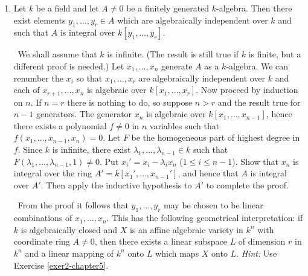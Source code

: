 \begin{enumerate}
    \textit{Hint:} Reduce to the two cases (a) $L$ separable over $K$ and (b) $L$ purely inseparable over $K$. In case (a), embed $L$ in a finite normal separable extension of $K$, and use Exercises \ref{exer13-chapter5} and \ref{exer14-chapter5}. In case (b), if $\mathfrak{q}$ is a prime ideal of $B$ such that $\mathfrak{q} \cap A = \mathfrak{p}$, show that $\mathfrak{q}$ is the set of all $x \in B$ such that $x^{p^m} \in \mathfrak{p}$ for some $m \geq 0$, where $p$ is the characteristic of $K$, and hence that $\Spec(B) \to \Spec(A)$ is bijective in this case.

    \emph{Noether's normalization lemma.}

    \item \label{exer16-chapter5} Let $k$ be a field and let $A \neq 0$ be a finitely generated $k$-algebra. Then there exist elements $y_1, \ldots, y_r \in A$ which are algebraically independent over $k$ and such that $A$ is integral over $k[y_1, \ldots, y_r]$.

    \quad\, We shall assume that $k$ is infinite. (The result is still true if $k$ is finite, but a different proof is needed.) Let $x_1, \ldots, x_n$ generate $A$ as a $k$-algebra. We can renumber the $x_i$ so that $x_1, \ldots, x_r$ are algebraically independent over $k$ and each of $x_{r+1}, \ldots, x_n$ is algebraic over $k[x_1, \ldots, x_r]$. Now proceed by induction on $n$. If $n = r$ there is nothing to do, so suppose $n > r$ and the result true for $n-1$ generators. The generator $x_n$ is algebraic over $k[x_1, \ldots, x_{n-1}]$, hence there exists a polynomial $f \neq 0$ in $n$ variables such that $f(x_1, \ldots, x_{n-1}, x_n) = 0$. Let $F$ be the homogeneous part of highest degree in $f$. Since $k$ is infinite, there exist $\lambda_1, \ldots, \lambda_{n-1} \in k$ such that $F(\lambda_1, \ldots, \lambda_{n-1}, 1) \neq 0$. Put $x_i' = x_i - \lambda_i x_n$ ($1 \leq i \leq n-1$). Show that $x_n$ is integral over the ring $A' = k[x_1', \ldots, x_{n-1}']$, and hence that $A$ is integral over $A'$. Then apply the inductive hypothesis to $A'$ to complete the proof.

    \quad\, From the proof it follows that $y_1, \ldots, y_r$ may be chosen to be linear combinations of $x_1, \ldots, x_n$. This has the following geometrical interpretation: if $k$ is algebraically closed and $X$ is an affine algebraic variety in $k^n$ with coordinate ring $A \neq 0$, then there exists a linear subspace $L$ of dimension $r$ in $k^n$ and a linear mapping of $k^n$ onto $L$ which maps $X$ onto $L$. \textit{Hint:} Use Exercise \ref{exer2-chapter5}.


\end{enumerate}
